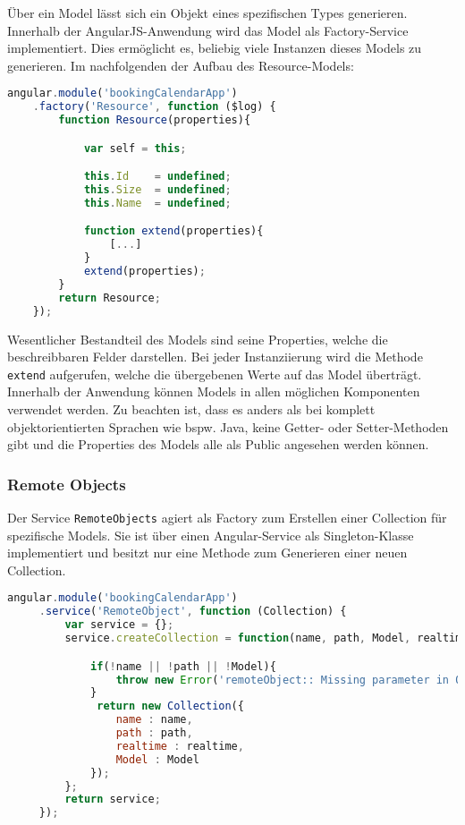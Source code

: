 Über ein Model lässt sich ein Objekt eines spezifischen Types generieren.
Innerhalb der AngularJS-Anwendung wird das Model als Factory-Service implementiert. Dies ermöglicht es, beliebig viele Instanzen dieses Models zu generieren.
Im nachfolgenden der Aufbau des Resource-Models:

\begin{lstlisting}[language=Javascript, label=code_ResourceModel, caption=Hauptteil des Resource-Models]
angular.module('bookingCalendarApp')
    .factory('Resource', function ($log) {
        function Resource(properties){

            var self = this;

            this.Id    = undefined;
            this.Size  = undefined;
            this.Name  = undefined;

            function extend(properties){
                [...]
            }
            extend(properties);
        }
        return Resource;
    });
\end{lstlisting}

Wesentlicher Bestandteil des Models sind seine Properties, welche die beschreibbaren Felder darstellen. Bei jeder Instanziierung wird die Methode \texttt{extend\(\)} aufgerufen, welche die
übergebenen Werte auf das Model überträgt.
Innerhalb der Anwendung können Models in allen möglichen Komponenten verwendet werden. Zu beachten ist, dass es anders als bei komplett objektorientierten Sprachen wie bspw. Java,
keine Getter- oder Setter-Methoden gibt und die Properties des Models alle als Public angesehen werden können.


\subsubsection{Remote Objects}
Der Service \texttt{RemoteObjects} agiert als Factory zum Erstellen einer Collection für spezifische Models. Sie ist über einen Angular-Service als Singleton-Klasse implementiert und besitzt
 nur eine Methode zum Generieren einer neuen Collection.

 \begin{lstlisting}[language=Javascript, label=code_RemoteObject, caption=Code des RemoteObjects-Service]
 angular.module('bookingCalendarApp')
     .service('RemoteObject', function (Collection) {
         var service = {};
         service.createCollection = function(name, path, Model, realtime){

             if(!name || !path || !Model){
                 throw new Error('remoteObject:: Missing parameter in Object')
             }
              return new Collection({
                 name : name,
                 path : path,
                 realtime : realtime,
                 Model : Model
             });
         };
         return service;
     });
\end{lstlisting}

